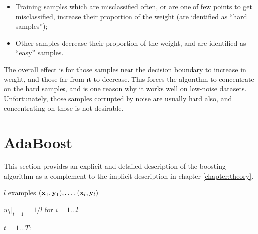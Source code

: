 \begin{itemize}

\item	Training samples which are misclassified often, or are one of 
	few points to get misclassified, increase their proportion of
	the weight (are identified as ``hard samples'');

\item	Other samples decrease their proportion of the weight, and are
	identified as ``easy'' samples.

\end{itemize}

The overall effect is for those samples near the decision boundary to
increase in weight, and those far from it to decrease.  This forces
the algorithm to concentrate on the hard samples, and is one reason
why it works well on low-noise datasets.  Unfortunately, those samples
corrupted by noise are usually hard also, and concentrating on those
is not desirable.

\section{AdaBoost}
\label{sec:adaboost}

This section provides an explicit and detailed description of the
boosting algorithm as a complement to the implicit description in
chapter \ref{chapter:theory}.

\par

 $l$ examples $(\mathbf{x}_1, \mathbf{y}_1), \ldots, (\mathbf{x}_l,
\mathbf{y}_l)$
\par
{} $w_i|_{t=1} = 1/l$ for $i=1 \ldots l$
\par
{} $t=1 \ldots T$:



